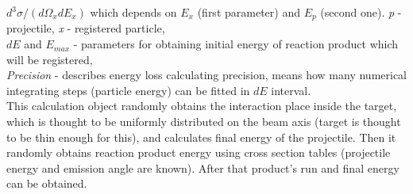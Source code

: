 \documentclass[a4paper]{article}
\begin{document}
{$d^3\sigma/(d\Omega_x dE_x)$ 
which depends on $E_x$ (first parameter) and $E_p$ (second one). \textit{p} - projectile, \textit{x} - registered particle,\\
\textit{$dE$} and {$E_{max}$} - parameters for obtaining initial energy of reaction product which will be registered,\\
\textit{Precision} - describes energy loss calculating precision, means how many numerical integrating steps (particle energy) can be fitted in \textit{$dE$} interval.\\
This calculation object randomly obtains the interaction place inside the target, which is thought to be uniformly distributed on the beam axis (target is thought to be thin enough for this), and calculates final energy of the projectile. 
Then it randomly obtains reaction product energy using cross section tables (projectile energy and emission angle are known).
After that product's run and final energy can be obtained.
}
\end{document}
